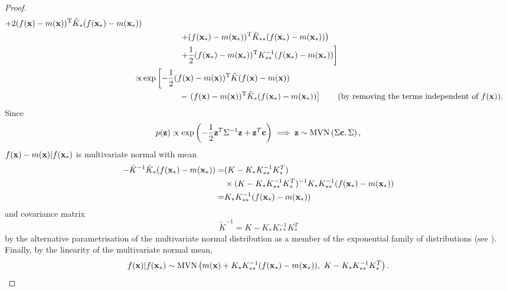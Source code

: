 \begin{proof}
\begin{align*}
        + 2 (f(\bx)-m(\bx))^\mathrm{T}
        \tilde{K}_{*}
        (f(\bx_*)-m(\bx_*))                                            \\
                & \hphantom{\exp \left[
        -\frac{1}{2} \left( \right.\right.}
        \left.
        + (f(\bx_*)-m(\bx_*))^\mathrm{T}
        \tilde{K}_{**}
        (f(\bx_*)-m(\bx_*))
        \right)
        \\
                & \hphantom{\exp \left[
        -\frac{1}{2} \left( \right.\right.}\left.
        + \frac{1}{2} (f(\bx_*)-m(\bx_*))^\mathrm{T}
        K_{**}^{-1}
        (f(\bx_*)-m(\bx_*))
        \right]                                                        \\
        \propto & \exp \left[
        -\frac{1}{2}
        (f(\bx)-m(\bx))^\mathrm{T}
        \tilde{K}
        (f(\bx)-m(\bx))\right.                                         \\
                & \hphantom{\exp \left[
        -\frac{1}{2} \left( \right.\right.}
        -\left.
        (f(\bx)-m(\bx))^\mathrm{T}
        \tilde{K}_{*}
        (f(\bx_*)-m(\bx_*))
        \right] \tag{by removing the terms independent of $f(\bx)$}.
    \end{align*}
    Since
    $$
        p(\mathbf{z})
        \propto \exp\left(
        -\frac{1}{2}\mathbf{z}^T\Sigma^{-1}\mathbf{z}
        + \mathbf{z}^T\mathbf{c}
        \right)
        \implies \mathbf{z} \sim \operatorname{MVN}\left(\Sigma \mathbf{c}, \Sigma\right),
    $$
    $f(\mathbf{x}) - m(\mathbf{x}) | f(\mathbf{x}_*)$ is
    multivariate normal with mean
    \begin{align*}
        - \tilde{K}^{-1}\tilde{K}_{*}(f(\mathbf{x}_*) - m(\mathbf{x}_*))
        = & (K - K_{*} K_{**}^{-1} K_{*}^T)                              \\
          & \times(K - K_{*} K_{**}^{-1} K_{*}^T)^{-1} K_{*} K_{**}^{-1}
        (f(\mathbf{x}_*) - m(\mathbf{x}_*))                                            \\
        = & K_{*} K_{**}^{-1}(f(\mathbf{x}_*) - m(\mathbf{x}_*))
    \end{align*}
    and covariance matrix
    $$
        \tilde{K}^{-1} = K - K_{*} K_{**}^{-1} K_{*}^T
    $$
    by the alternative parametrisation of the multivariate normal distribution
    as a member of the exponential family of distributions
    (see \cite[Table of Distributions]{noauthor_exponential_2024}).
    Finally, by the linearity of the multivariate normal mean,
    $$
        f(\mathbf{x}) | f(\mathbf{x}_*)
        \sim \operatorname{MVN}\left(
        m(\mathbf{x}) + K_{*}K_{**}^{-1}(f(\mathbf{x}_*) - m(\mathbf{x}_*)), \,\,
        K - K_{*}K_{**}^{-1}K_{*}^T
        \right).
    $$
\end{proof}

